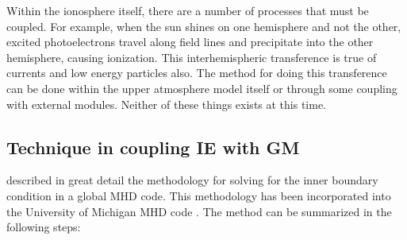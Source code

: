Within the ionosphere itself, there are a number of processes that
must be coupled.  For example, when the sun shines on one hemisphere
and not the other, excited photoelectrons travel along field lines and
precipitate into the other hemisphere, causing ionization.  This
interhemispheric transference is true of currents and low energy
particles also.  The method for doing this transference can be done
within the upper atmosphere model itself or through some coupling with
external modules.  Neither of these things exists at this time.

\subsection{Technique in coupling IE with GM}

\cite{goodman95} described in great detail the methodology for solving
for the inner boundary condition in a global MHD code.  This
methodology has been incorporated into the University of Michigan MHD
code \cite{powell99, ridley_aec, ridley_metrics}.  The method can be
summarized in the following steps:

